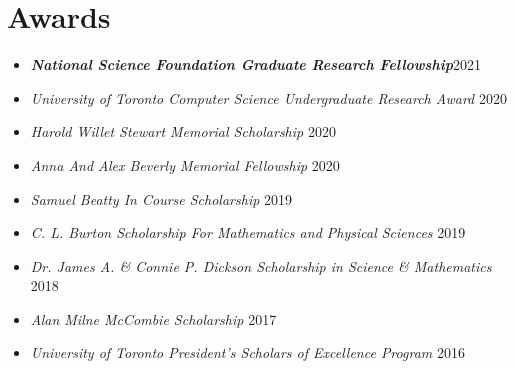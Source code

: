 \documentclass{article}
\begin{document}
%


    \section{Awards}
    \begin{itemize}
     \setlength\itemsep{1.3ex}
    	\item \textbf{\textsl{National Science Foundation Graduate Research Fellowship}}\hfill 2021
        \item \textsl{University of Toronto Computer Science Undergraduate Research Award} \hfill 2020
        \item \textsl{Harold Willet Stewart Memorial Scholarship} \hfill 2020
        \item \textsl{Anna And Alex Beverly Memorial Fellowship} \hfill 2020
        \item \textsl{Samuel Beatty In Course Scholarship} \hfill 2019
        \item \textsl{C. L. Burton Scholarship For Mathematics and Physical Sciences} \hfill 2019
        \item \textsl{Dr. James A. \& Connie P. Dickson Scholarship in Science \& Mathematics} \hfill 2018
        \item \textsl{Alan Milne McCombie Scholarship} \hfill 2017
        \item \textsl{University of Toronto President's Scholars of Excellence Program} \hfill 2016
    \end{itemize}
\end{document}
